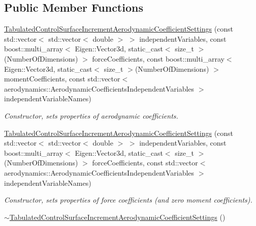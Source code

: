 \subsection*{Public Member Functions}
\begin{DoxyCompactItemize}
\item 
\hyperlink{classtudat_1_1simulation__setup_1_1TabulatedControlSurfaceIncrementAerodynamicCoefficientSettings_ab4e9d9bea4de8bd5ca83b725cfad5da3}{Tabulated\+Control\+Surface\+Increment\+Aerodynamic\+Coefficient\+Settings} (const std\+::vector$<$ std\+::vector$<$ double $>$ $>$ independent\+Variables, const boost\+::multi\+\_\+array$<$ Eigen\+::\+Vector3d, static\+\_\+cast$<$ size\+\_\+t $>$(Number\+Of\+Dimensions) $>$ force\+Coefficients, const boost\+::multi\+\_\+array$<$ Eigen\+::\+Vector3d, static\+\_\+cast$<$ size\+\_\+t $>$(Number\+Of\+Dimensions) $>$ moment\+Coefficients, const std\+::vector$<$ aerodynamics\+::\+Aerodynamic\+Coefficients\+Independent\+Variables $>$ independent\+Variable\+Names)
\begin{DoxyCompactList}\small\item\em Constructor, sets properties of aerodynamic coefficients. \end{DoxyCompactList}\item 
\hyperlink{classtudat_1_1simulation__setup_1_1TabulatedControlSurfaceIncrementAerodynamicCoefficientSettings_a1bc0cfc512d5a93fbd5dcc26c327a762}{Tabulated\+Control\+Surface\+Increment\+Aerodynamic\+Coefficient\+Settings} (const std\+::vector$<$ std\+::vector$<$ double $>$ $>$ independent\+Variables, const boost\+::multi\+\_\+array$<$ Eigen\+::\+Vector3d, static\+\_\+cast$<$ size\+\_\+t $>$(Number\+Of\+Dimensions) $>$ force\+Coefficients, const std\+::vector$<$ aerodynamics\+::\+Aerodynamic\+Coefficients\+Independent\+Variables $>$ independent\+Variable\+Names)
\begin{DoxyCompactList}\small\item\em Constructor, sets properties of force coefficients (and zero moment coefficients). \end{DoxyCompactList}\item 
\hyperlink{classtudat_1_1simulation__setup_1_1TabulatedControlSurfaceIncrementAerodynamicCoefficientSettings_a6237a12c16607dc783a0c3a7acf836d1}{$\sim$\+Tabulated\+Control\+Surface\+Increment\+Aerodynamic\+Coefficient\+Settings} ()\hypertarget{classtudat_1_1simulation__setup_1_1TabulatedControlSurfaceIncrementAerodynamicCoefficientSettings_a6237a12c16607dc783a0c3a7acf836d1}{}\label{classtudat_1_1simulation__setup_1_1TabulatedControlSurfaceIncrementAerodynamicCoefficientSettings_a6237a12c16607dc783a0c3a7acf836d1}


\end{DoxyCompactItemize}
